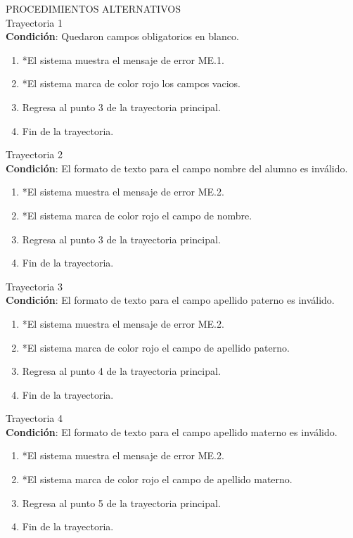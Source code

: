 \vspace*{1cm}
\Large{PROCEDIMIENTOS ALTERNATIVOS}\\
\large{Trayectoria 1}\\
\textbf{Condición}: Quedaron campos obligatorios en blanco.
\begin{enumerate}
    \item *El sistema muestra el mensaje de error ME.1.
    \item *El sistema marca de color rojo los campos vacios.
    \item Regresa al punto 3 de la trayectoria principal.
    \item Fin de la trayectoria.
\end{enumerate}
\large{Trayectoria 2}\\
\textbf{Condición}: El formato de texto para el campo nombre del alumno es inválido.
\begin{enumerate}
    \item *El sistema muestra el mensaje de error ME.2.
    \item *El sistema marca de color rojo el campo de nombre.
    \item Regresa al punto 3 de la trayectoria principal.
    \item Fin de la trayectoria.
\end{enumerate}
\large{Trayectoria 3}\\
\textbf{Condición}: El formato de texto para el campo apellido paterno es inválido.
\begin{enumerate}
    \item *El sistema muestra el mensaje de error ME.2.
    \item *El sistema marca de color rojo el campo de apellido paterno.
    \item Regresa al punto 4 de la trayectoria principal.
    \item Fin de la trayectoria.
\end{enumerate}
\large{Trayectoria 4}\\
\textbf{Condición}: El formato de texto para el campo apellido materno es inválido.
\begin{enumerate}
    \item *El sistema muestra el mensaje de error ME.2.
    \item *El sistema marca de color rojo el campo de apellido materno.
    \item Regresa al punto 5 de la trayectoria principal.
    \item Fin de la trayectoria.
\end{enumerate}
